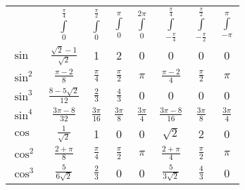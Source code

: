 \renewcommand{\arraystretch}{1.5}
\setlength\tabcolsep{8pt} %
\begin{tabularx}{\linewidth}{@{}lccccccc@{}}
                        & $\int\limits_0^{\frac{\pi}{4}} $ & $\int\limits_0^{\frac{\pi}{2}}$ & $\int\limits_0^{\pi}$ & $\int\limits_0^{2\pi}$ & $\int\limits_{-\frac{\pi}{4}}^{\frac{\pi}{4}} $ & $\int\limits_{-\frac{\pi}{2}}^{\frac{\pi}{2}} $ & $\int\limits_{-\pi}^{\pi}$ \\ 
    \cmidrule{2-8}
    $\sin$              & $\frac{\sqrt{2}-1}{\sqrt{2}}$    & 1                               & 2                     & 0                      & 0                                               & 0                                               & 0                          \\ 
    $\sin^2$            & $\frac{\pi-2}{8}$                & $\frac{\pi}{4}$                 & $\frac{\pi}{2}$       & $\pi$                  & $\frac{\pi-2}{4}$                               & $\frac{\pi}{2}$                                 & $\pi$                      \\
    $\sin^3$            & $\frac{8-5\sqrt{2}}{12}$         & $\frac{2}{3}$                   & $\frac{4}{3}$         & 0                      & 0                                               & 0                                               & 0                          \\
    $\sin^4$            & $\frac{3\pi-8}{32}$              & $\frac{3\pi}{16}$               & $\frac{3\pi}{8}$      & $\frac{3\pi}{4}$       & $\frac{3\pi-8}{16}$                             & $\frac{3\pi}{8}$                                & $\frac{3\pi}{4}$           \\
    $\cos$              & $ \frac{1}{\sqrt{2}}$            & 1                               & 0                     & 0                      & $\sqrt{2}$                                      & 2                                               & 0                          \\
    $\cos^2$            & $\frac{2+\pi}{8}$                & $\frac{\pi}{4}$                 & $\frac{\pi}{2}$       & $\pi$                  & $\frac{2+\pi}{4}$                               & $\frac{\pi}{2}$                                 & $\pi$                      \\
    $\cos^3$            & $\frac{5}{6\sqrt{2}}$            & $\frac{2}{3}$                   & 0                     & 0                      & $\frac{5}{3\sqrt{2}}$                           & $\frac{4}{3}$                                   & 0                          \\

\end{tabularx}

